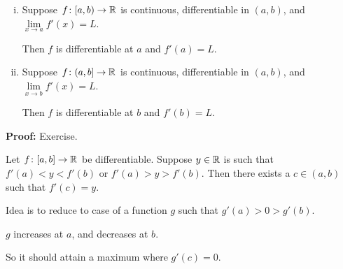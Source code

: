 \documentclass[10pt,aspectratio=149]{beamer}
\begin{document}
\begin{frame}

\begin{proposition}
\begin{enumerate}[(i)]
\item
\pause
Suppose $f \colon [a,b) \to {\mathbb{R}}$ is continuous, differentiable in $(a,b)$,
and $\lim\limits_{x \to a} f'(x) = L$.

\pause
Then $f$ is differentiable at $a$ and $f'(a) = L$.
\item
\pause
Suppose $f \colon (a,b] \to {\mathbb{R}}$ is continuous, differentiable in $(a,b)$,
and $\lim\limits_{x \to b} f'(x) = L$.

\pause
Then $f$ is differentiable at $b$ and $f'(b) = L$.
\end{enumerate}
\end{proposition}

\pause
\textbf{Proof:} Exercise.

\end{frame}

\begin{frame}

\begin{theorem}[Darboux]
Let $f \colon [a,b] \to {\mathbb{R}}$ be differentiable.  Suppose $y \in {\mathbb{R}}$ is such
that $f'(a) < y < f'(b)$ or
$f'(a) > y > f'(b)$.
\pause
Then there exists a $c \in (a,b)$ such that $f'(c) =
y$.
\end{theorem}

\pause
Idea is to reduce to case of a function $g$ such that
$g'(a) > 0 > g'(b)$.

\pause
\medskip

$g$ increases at $a$, and decreases at $b$.

\pause
\medskip

So it should attain a maximum where $g'(c) = 0$.

\pause
\medskip

\begin{center}
\end{center}

\end{frame}
\end{document}
